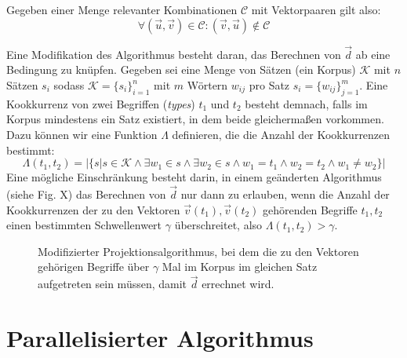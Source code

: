 Gegeben einer Menge relevanter Kombinationen $\mathcal{C}$ mit Vektorpaaren gilt also:
\begin{equation}
  \forall (\vec{u}, \vec{v}) \in \mathcal{C}: (\vec{v}, \vec{u}) \notin \mathcal{C}
\end{equation}

Eine Modifikation des Algorithmus besteht daran, das Berechnen von $\vec{d}$ ab eine Bedingung zu knüpfen.
Gegeben sei eine Menge von Sätzen (ein Korpus) $\mathcal{K}$ mit $n$ Sätzen $s_i$ sodass $\mathcal{K} = \{s_i\}_{i=1}^{n}$ mit
$m$ Wörtern $w_{ij}$ pro Satz $s_i = \{w_{ij}\}_{j=1}^m$. Eine Kookkurrenz von zwei Begriffen (\emph{types}) $t_1$ und $t_2$
besteht demnach, falls im Korpus mindestens ein Satz existiert, in dem beide gleichermaßen vorkommen. Dazu können wir
eine Funktion $\Lambda$ definieren, die die Anzahl der Kookkurrenzen bestimmt:
\begin{equation}
  \Lambda(t_1, t_2) = |\{s | s\in\mathcal{K} \land \exists w_1\in s \land \exists w_2\in s \land w_1 = t_1 \land w_2 = t_2 \land w_1 \neq w_2\}|
\end{equation}
Eine mögliche Einschränkung besteht darin, in einem geänderten Algorithmus (siehe Fig. X) das Berechnen von $\vec{d}$ nur
dann zu erlauben, wenn die Anzahl der Kookkurrenzen der zu den Vektoren $\vec{v}(t_1), \vec{v}(t_2)$ gehörenden Begriffe $t_1, t_2$
einen bestimmten Schwellenwert $\gamma$ überschreitet, also $\Lambda(t_1, t_2) > \gamma$.

\begin{figure}[h]
  \centering
  \begin{algorithm}[H]
  \end{algorithm}
  \caption[Modifizierter Projektionsalgorithmus]{Modifizierter Projektionsalgorithmus, bei dem die zu den Vektoren gehörigen
  Begriffe über $\gamma$ Mal im Korpus im gleichen Satz aufgetreten sein müssen, damit $\vec{d}$ errechnet wird.}
\end{figure}


\section{Parallelisierter Algorithmus}
